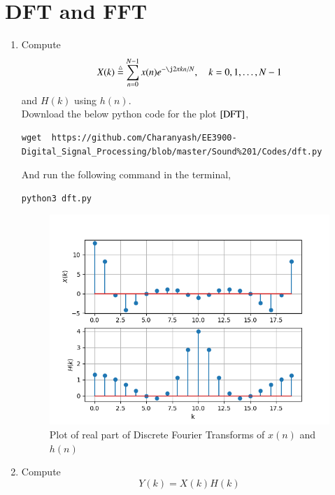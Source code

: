 \documentclass[journal,12pt,twocolumn]{IEEEtran}
\renewcommand\thesection{\arabic{section}}
\begin{document}
\section{DFT and FFT}
\begin{enumerate}[label=\thesection.\arabic*]
     \item
           Compute
           \begin{equation}
                X(k) \define \sum _{n=0}^{N-1}x(n) e^{-\j2\pi kn/N}, \quad k = 0,1,\dots, N-1
           \end{equation}
           and $H(k)$ using $h(n)$.\\
           \solution Download the below python code for the plot $\ref{DFT}$,
           \begin{lstlisting}
wget  https://github.com/Charanyash/EE3900-Digital_Signal_Processing/blob/master/Sound%201/Codes/dft.py
\end{lstlisting}
           And run the following command in the terminal,
           \begin{lstlisting}
python3 dft.py
\end{lstlisting}
           \begin{figure}[!h]
                \includegraphics[width = \columnwidth]{figs/dft.png}
                \centering
                \caption{Plot of real part of Discrete Fourier Transforms of $x(n)$ and $h(n)$}
                \label{DFT}
           \end{figure}
     \item Compute
           \begin{equation}
                Y(k) = X(k)H(k)
           \end{equation}

\end{enumerate}
\end{document}
